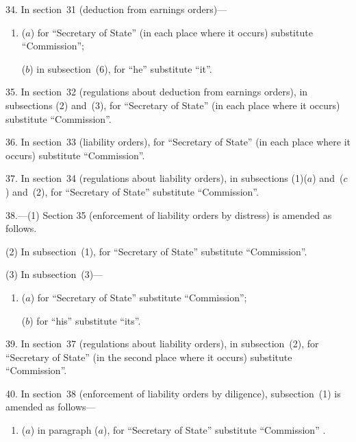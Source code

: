 \documentclass[12pt,a4paper]{article}
\begin{document}
\medskip

34. In section~31 (deduction from earnings orders)—
\begin{enumerate}\item[]
($a$) for “Secretary of State” (in each place where it occurs) substitute “Commission”;

($b$) in subsection~(6), for “he” substitute “it”.
\end{enumerate}

\medskip

35. In section~32 (regulations about deduction from earnings orders), in subsections (2) and~(3), for “Secretary of State” (in each place where it occurs) substitute “Commission”.

\medskip

36. In section~33 (liability orders), for “Secretary of State” (in each place where it occurs) substitute “Commission”.

\medskip

37. In section~34 (regulations about liability orders), in subsections (1)($a$) and~($c$) and~(2), for “Secretary of State” substitute “Commission”.

\medskip

38.---(1) Section 35 (enforcement of liability orders by distress) is amended as follows.

(2) In subsection~(1), for “Secretary of State” substitute “Commission”.

(3) In subsection~(3)—
\begin{enumerate}\item[]
($a$) for “Secretary of State” substitute “Commission”;

($b$) for “his” substitute “its”.
\end{enumerate}

\medskip

39. In section~37 (regulations about liability orders), in subsection~(2), for “Secretary of State” (in the second place where it occurs) substitute “Commission”.

\medskip

40. In section~38 (enforcement of liability orders by diligence), subsection~(1) is amended as follows—
\begin{enumerate}\item[]
($a$) in paragraph ($a$), for “Secretary of State” substitute “Commission”%
%
%
.
\end{enumerate}
\end{document}
